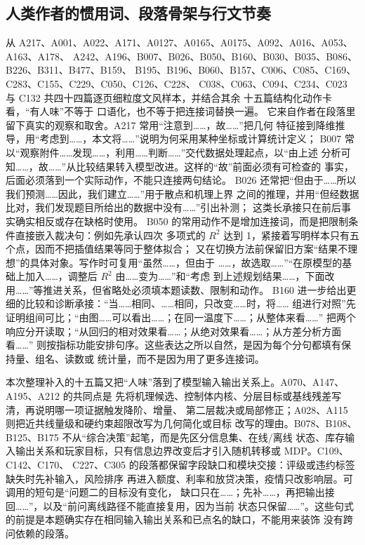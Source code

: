 \subsection{人类作者的惯用词、段落骨架与行文节奏}

从 A217、A001、A022、A171、A0127、A0165、A0175、A092、A016、A053、A163、A178、
A242、A196、B007、B026、B050、B160、B030、B035、B086、B226、B311、B477、B159、
B195、B196、B060、B157、C006、C085、C169、C283、C155、C229、C050、C126、C228、
C038、C063、C094、C234、C023 与 C132 共四十四篇逐页细粒度文风样本，并结合其余
十五篇结构化动作卡看，“有人味”不等于
口语化，也不等于把连接词替换一遍。
它来自作者在段落里留下真实的观察和取舍。A217 常用“注意到……，故……”把几何
特征接到降维推导，用“考虑到……，本文将……”说明为何采用某种坐标或计算统计定义；
B007 常以“观察附件……发现……，利用……判断……”交代数据处理起点，以“由上述
分析可知……，故……”从比较结果转入模型改进。这样的“故”前面必须有可检查的
事实，后面必须落到一个实际动作，不能只连接两句结论。
B026 还常把“但由于……所以我们预测……因此，我们建立……”用于散点和机理上界
之间的推理，并用“但经数据比对，我们发现题目所给出的数据中没有……”引出补测；
这类长承接只在前后事实确实相反或存在缺格时使用。
B050 的常用动作不是增加连接词，而是把限制条件直接嵌入裁决句：例如先承认四次
多项式的 $R^2$ 达到 1，紧接着写明样本只有五个点，因而不把插值结果等同于整体拟合；
又在切换方法前保留旧方案“结果不理想”的具体对象。写作时可复用“虽然……，但由于
……，故选取……”“在原模型的基础上加入……，调整后 $R^2$ 由……变为……”和“考虑
到上述规划结果……，下面改用……”等推进关系，但省略处必须填本题读数、限制和动作。
B160 进一步给出更细的比较和诊断承接：“当……相同、……相同，只改变……时，将……
组进行对照”先证明组间可比；“由图……可以看出……；在同一温度下……；从整体来看……”
把两个响应分开读取；“从回归的相对效果看……；从绝对效果看……；从方差分析方面看……”
则按指标功能安排句序。这些表达之所以自然，是因为每个分句都填有保持量、组名、读数或
统计量，而不是因为用了更多连接词。

本次整理补入的十五篇又把“人味”落到了模型输入输出关系上。A070、A147、A195、A212 的共同点是
先将机理候选、控制体内核、分层目标或基线残差写清，再说明哪一项证据触发降阶、增量、
第二层裁决或局部修正；A028、A115 则把近共线量级和硬约束超限改写为几何简化或目标
改写的理由。B078、B108、B125、B175 不从“综合决策”起笔，而是先区分信息集、在线/离线
状态、库存输入输出关系和玩家目标，只有信息边界改变后才引入随机转移或 MDP。C109、C142、C170、
C227、C305 的段落都保留字段缺口和模块交接：评级或违约标签缺失时先补输入，风险排序
再进入额度、利率和放贷决策，疫情只改影响层。可调用的短句是“问题二的目标没有变化，
缺口只在……；先补……，再把输出接回……”，以及“前问离线路径不能直接复用，因为当前
状态只保留……”。这些句式的前提是本题确实存在相同输入输出关系和已点名的缺口，不能用来装饰
没有跨问依赖的段落。

